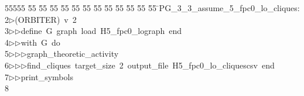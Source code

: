%
%
\begin{tabbing}
55555 \= 55 \= 55 \= 55 \= 55 \= 55 \= 55 \= 55 \= 55 \= 55 \= 55 \= 55 \= 55 \= \>PG\_3\_3\_assume\_5\_fpc0\_lo\_cliques:\\[0pt]
2\>$\triangleright$\>(ORBITER)\ v\ 2\ \\[0pt]
3\>$\triangleright$\>$\triangleright$\>define\ G\ graph\ load\ H5\_fpc0\_lograph\ end\ \\[0pt]
4\>$\triangleright$\>$\triangleright$\>with\ G\ do\ \\[0pt]
5\>$\triangleright$\>$\triangleright$\>$\triangleright$\>graph\_theoretic\_activity\ \\[0pt]
6\>$\triangleright$\>$\triangleright$\>$\triangleright$\>find\_cliques\ target\_size\ 2\ output\_file\ H5\_fpc0\_lo\_cliquescsv\ end\ \\[0pt]
7\>$\triangleright$\>$\triangleright$\>print\_symbols\\[0pt]
8\>\end{tabbing}

